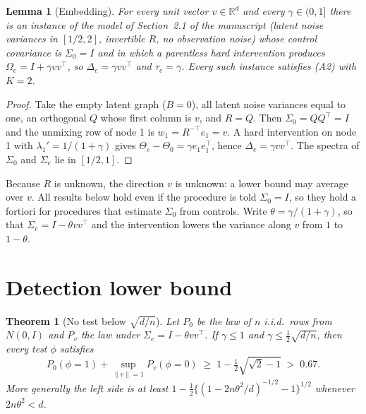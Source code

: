 \documentclass[11pt]{article}
\newtheorem{theorem}{Theorem}
\newtheorem{lemma}{Lemma}
\newcommand{\R}{\mathbb{R}}
\begin{document}
\begin{lemma}[Embedding]
\label{lem:embed}
For every unit vector $v\in\R^d$ and every $\gamma\in(0,1]$ there is an instance of the model of Section~2.1 of the manuscript (latent noise variances in $[1/2,2]$, invertible $R$, no observation noise) whose control covariance is $\Sigma_0=I$ and in which a parentless hard intervention produces $\Omega_e=I+\gamma vv^\top$, so $\Delta_e=\gamma vv^\top$ and $\tau_e=\gamma$. Every such instance satisfies (A2) with $K=2$.
\end{lemma}

\begin{proof}
Take the empty latent graph ($B=0$), all latent noise variances equal to one, an orthogonal $Q$ whose first column is $v$, and $R=Q$. Then $\Sigma_0=QQ^\top=I$ and the unmixing row of node 1 is $w_1=R^{-\top}e_1=v$. A hard intervention on node 1 with $\lambda_1'=1/(1+\gamma)$ gives $\Theta_e-\Theta_0=\gamma e_1e_1^\top$, hence $\Delta_e=\gamma vv^\top$. The spectra of $\Sigma_0$ and $\Sigma_e$ lie in $[1/2,1]$.
\end{proof}

Because $R$ is unknown, the direction $v$ is unknown: a lower bound may average over $v$. All results below hold even if the procedure is told $\Sigma_0=I$, so they hold a fortiori for procedures that estimate $\Sigma_0$ from controls. Write $\theta=\gamma/(1+\gamma)$, so that $\Sigma_e=I-\theta vv^\top$ and the intervention lowers the variance along $v$ from $1$ to $1-\theta$.

\section{Detection lower bound}

\begin{theorem}[No test below $\sqrt{d/n}$]
\label{thm:det}
Let $P_0$ be the law of $n$ i.i.d.\ rows from $N(0,I)$ and $P_v$ the law under $\Sigma_e=I-\theta vv^\top$. If $\gamma\le1$ and $\gamma\le\tfrac12\sqrt{d/n}$, then every test $\phi$ satisfies
\[
  P_0(\phi=1)+\sup_{\|v\|=1}P_v(\phi=0)\;\ge\;1-\tfrac12\sqrt{\sqrt2-1}\;>\;0.67 .
\]
More generally the left side is at least $1-\tfrac12\{(1-2n\theta^2/d)^{-1/2}-1\}^{1/2}$ whenever $2n\theta^2<d$.
\end{theorem}
\end{document}
